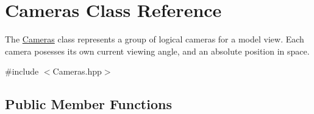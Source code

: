 \hypertarget{class_cameras}{\section{\-Cameras \-Class \-Reference}
\label{class_cameras}
}


\-The \hyperlink{class_cameras}{\-Cameras} class represents a group of logical cameras for a model view. \-Each camera posesses its own current viewing angle, and an absolute position in space.  




{\ttfamily \#include $<$\-Cameras.\-hpp$>$}

\subsection*{\-Public \-Member \-Functions}
